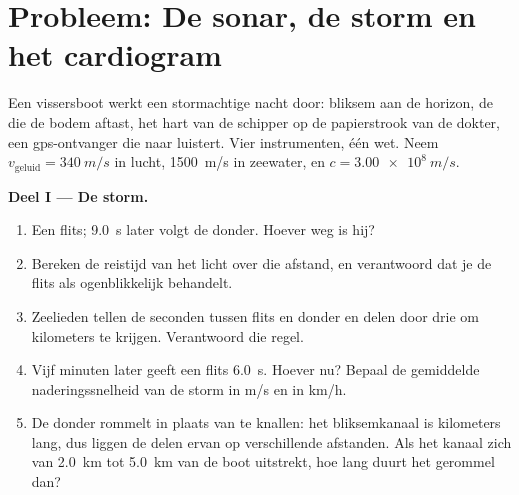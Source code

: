 \section{Probleem: De sonar, de storm en het cardiogram}

\begin{problem}[{Weekendopgave --- de signalen van de wereld lezen: één
wet, $d = v\,t$, meet een storm, brengt een zeebodem in kaart, telt een
hartslag en ontrafelt hoe gps werkt}]
\label{pb:g10:signals-and-waves:1}
Een vissersboot werkt een stormachtige nacht door: bliksem aan de
horizon, de  die de bodem aftast, het hart van de schipper op de
papierstrook van de dokter, een gps-ontvanger die naar 
luistert. Vier instrumenten, één wet. Neem
$v_{\text{geluid}} = \qty{340}{m/s}$ in lucht, \qty{1500}{m/s} in
zeewater, en $c = \qty{3.00e8}{m/s}$.

\medskip
\noindent\textbf{Deel I --- De storm.}
\begin{enumerate}
  \item Een flits; \qty{9.0}{s} later volgt de donder. Hoever weg is
        hij?
  \item Bereken de reistijd van het licht over die afstand, en
        verantwoord dat je de flits als ogenblikkelijk behandelt.
  \item Zeelieden tellen de seconden tussen flits en donder en delen door
        drie om kilometers te krijgen. Verantwoord die regel.
  \item Vijf minuten later geeft een flits \qty{6.0}{s}. Hoever nu?
        Bepaal de gemiddelde naderingssnelheid van de storm in
        \unit{m/s} en in \unit{km/h}.
  \item De donder rommelt in plaats van te knallen: het bliksemkanaal is
        kilometers lang, dus liggen de delen ervan op verschillende
        afstanden. Als het kanaal zich van \qty{2.0}{km} tot
        \qty{5.0}{km} van de boot uitstrekt, hoe lang duurt het gerommel
        dan?
\end{enumerate}


\end{problem}
